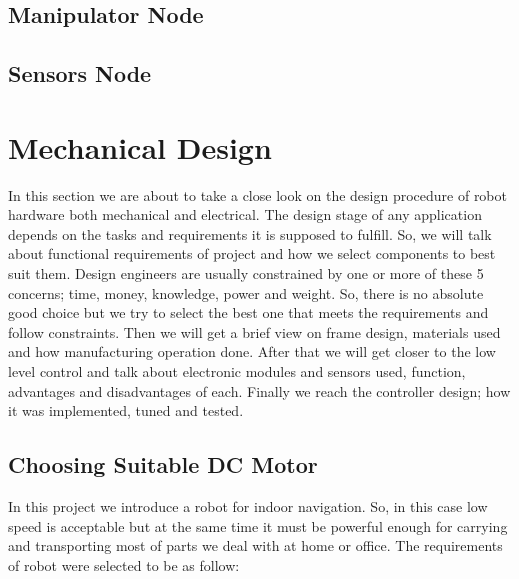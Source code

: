 \documentclass[12pt]{article}
\begin{document}
\subsection{Manipulator Node}

\subsection{Sensors Node}

\newpage

\section{Mechanical Design}
In this section we are about to take a close look on the design procedure of robot hardware both mechanical and electrical. The design stage of any application depends on the tasks and requirements it is supposed to fulfill. So, we will talk about functional requirements of project and how we select components to best suit them. Design engineers are usually constrained by one or more of these 5 concerns; time, money, knowledge, power and weight. So, there is no absolute good choice but we try to select the best one that meets the requirements and follow constraints. \cite{203} Then we will get a brief view on frame design, materials used and how manufacturing operation done. After that we will get closer to the low level control and talk about electronic modules and sensors used, function, advantages and disadvantages of each. Finally we reach the controller design; how it was implemented, tuned and tested.  

\subsection{Choosing Suitable DC Motor  \cite{203}}
In this project we introduce a robot for indoor navigation. So, in this case low speed is acceptable but at the same time it must be powerful enough for carrying and transporting most of parts we deal with at home or office. The requirements of robot were selected to be as follow:
\end{document}
